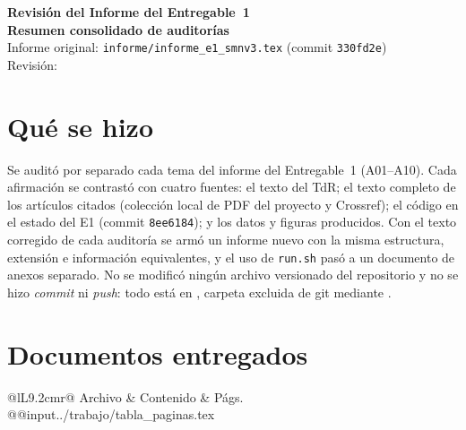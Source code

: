 \newcommand{\auditoriaid}{A00 -- Resumen consolidado}



\begin{center}
{\Large\bfseries Revisión del Informe del Entregable~1\\[0.2em] Resumen consolidado de auditorías}\\[0.5em]
{\normalsize Informe original: \texttt{informe/informe\_e1\_smnv3.tex} (commit \texttt{330fd2e})}\\[0.2em]
{\small Revisión: \fechaentrega}
\end{center}

\section{Qué se hizo}

Se auditó por separado cada tema del informe del Entregable~1 (A01--A10). Cada afirmación se contrastó con cuatro fuentes: el texto del TdR; el texto completo de los artículos citados (colección local de PDF del proyecto y Crossref); el código en el estado del E1 (commit \texttt{8ee6184}); y los datos y figuras producidos. Con el texto corregido de cada auditoría se armó un informe nuevo con la misma estructura, extensión e información equivalentes, y el uso de \texttt{run.sh} pasó a un documento de anexos separado. No se modificó ningún archivo versionado del repositorio y no se hizo \emph{commit} ni \emph{push}: todo está en , carpeta excluida de git mediante .


\section{Documentos entregados}

\begin{center}\small
\begin{tabular}{@{}lL{9.2cm}r@{}}
\toprule
Archivo & Contenido & Págs. \\
\midrule
\csname @@input\endcsname ../trabajo/tabla_paginas.tex 
\bottomrule
\end{tabular}
\end{center}


